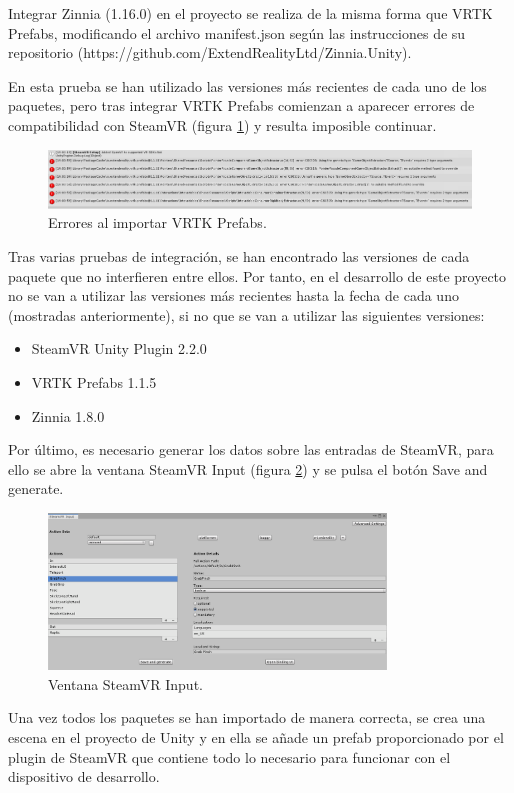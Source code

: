 Integrar Zinnia (1.16.0) en el proyecto se realiza de la misma forma que VRTK Prefabs, modificando el archivo manifest.json según las instrucciones de su repositorio (https://github.com/ExtendRealityLtd/Zinnia.Unity).

En esta prueba se han utilizado las versiones más recientes de cada uno de los paquetes, pero tras integrar VRTK Prefabs comienzan a aparecer errores de compatibilidad con SteamVR (figura \ref{fig:erroresVrtk}) y resulta imposible continuar.

\begin{figure}
  \centering
    \includegraphics[width=1\textwidth]{04.Desarrollo/01.Entrega1/01.Iteracion1_1/00.Figuras/03.errores_vrtk.png}
    \caption{Errores al importar VRTK Prefabs.}
    \label{fig:erroresVrtk}
\end{figure}

Tras varias pruebas de integración, se han encontrado las versiones de cada paquete que no interfieren entre ellos. Por tanto, en el desarrollo de este proyecto no se van a utilizar las versiones más recientes hasta la fecha de cada uno (mostradas anteriormente), si no que se van a utilizar las siguientes versiones:


\begin{itemize}
	\item{SteamVR Unity Plugin 2.2.0}

	\item{VRTK Prefabs 1.1.5}
	
	\item{Zinnia 1.8.0}

\end{itemize}

Por último, es necesario generar los datos sobre las entradas de SteamVR, para ello se abre la ventana SteamVR Input (figura \ref{fig:inputCompile}) y se pulsa el botón Save and generate.

\begin{figure}
  \centering
    \includegraphics[width=0.8\textwidth]{04.Desarrollo/01.Entrega1/01.Iteracion1_1/00.Figuras/04.input_compile.png}
    \caption{Ventana SteamVR Input.}
    \label{fig:inputCompile}
\end{figure}

Una vez todos los paquetes se han importado de manera correcta, se crea una escena en el proyecto de Unity y en ella se añade un prefab proporcionado por el plugin de SteamVR que contiene todo lo necesario para funcionar con el dispositivo de desarrollo.


